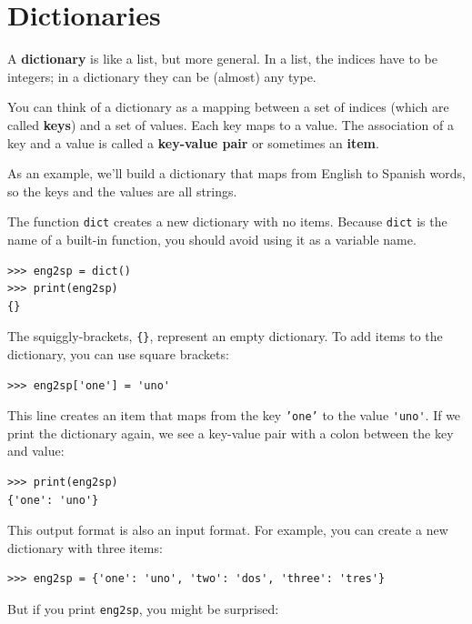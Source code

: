\documentclass[10pt]{book}
\begin{document}
\chapter{Dictionaries}


A {\bf dictionary} is like a list, but more general.  In a list,
the indices have to be integers; in a dictionary they can
be (almost) any type.

You can think of a dictionary as a mapping between a set of indices
(which are called {\bf keys}) and a set of values.  Each key maps to a
value.  The association of a key and a value is called a {\bf
  key-value pair} or sometimes an {\bf item}.

As an example, we'll build a dictionary that maps from English
to Spanish words, so the keys and the values are all strings.

The function {\tt dict} creates a new dictionary with no items.
Because {\tt dict} is the name of a built-in function, you
should avoid using it as a variable name.


\beforeverb
\begin{verbatim}
>>> eng2sp = dict()
>>> print(eng2sp)
{}
\end{verbatim}
\afterverb

The squiggly-brackets, \verb"{}", represent an empty dictionary.
To add items to the dictionary, you can use square brackets:


\beforeverb
\begin{verbatim}
>>> eng2sp['one'] = 'uno'
\end{verbatim}
\afterverb
%
This line creates an item that maps from the key
{\tt 'one'} to the value \verb"'uno'".  If we print the
dictionary again, we see a key-value pair with a colon
between the key and value:

\beforeverb
\begin{verbatim}
>>> print(eng2sp)
{'one': 'uno'}
\end{verbatim}
\afterverb
%
This output format is also an input format.  For example,
you can create a new dictionary with three items:

\beforeverb
\begin{verbatim}
>>> eng2sp = {'one': 'uno', 'two': 'dos', 'three': 'tres'}
\end{verbatim}
\afterverb
%
But if you print {\tt eng2sp}, you might be surprised:
\end{document}
